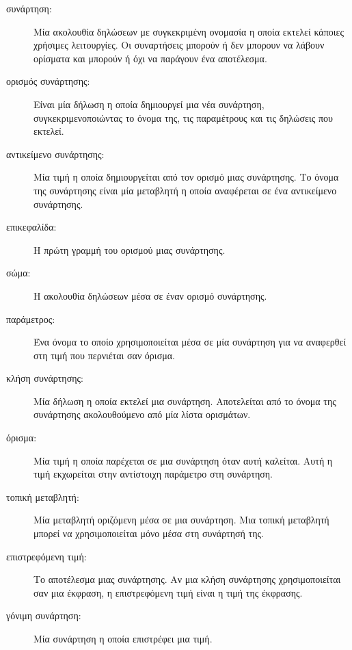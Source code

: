 \documentclass[10pt]{book}
\begin{document}
\begin{description}

\item[συνάρτηση:] Μία ακολουθία δηλώσεων με συγκεκριμένη ονομασία η οποία εκτελεί κάποιες
χρήσιμες λειτουργίες. Οι συναρτήσεις μπορούν ή δεν μπορουν να λάβουν ορίσματα
και μπορούν ή όχι να παράγουν ένα αποτέλεσμα.

\item[ορισμός συνάρτησης:] Είναι μία δήλωση η οποία δημιουργεί μια νέα συνάρτηση,
συγκεκριμενοποιώντας το όνομα της, τις παραμέτρους και τις δηλώσεις που εκτελεί.

\item[αντικείμενο συνάρτησης: ] Μία τιμή η οποία δημιουργείται από τον ορισμό μιας συνάρτησης.
Το όνομα της συνάρτησης είναι μία μεταβλητή η οποία αναφέρεται σε ένα αντικείμενο
συνάρτησης.

\item[επικεφαλίδα:] Η πρώτη γραμμή του ορισμού μιας συνάρτησης.

\item[σώμα:] Η ακολουθία δηλώσεων μέσα σε έναν ορισμό συνάρτησης.

\item[παράμετρος:] Ένα όνομα το οποίο χρησιμοποιείται μέσα σε μία συνάρτηση για να
αναφερθεί στη τιμή που περνιέται σαν όρισμα.

\item[κλήση συνάρτησης:] Μία δήλωση η οποία εκτελεί μια συνάρτηση. Αποτελείται από το
όνομα της συνάρτησης ακολουθούμενο από μία λίστα ορισμάτων.

\item[όρισμα:] Μία τιμή η οποία παρέχεται σε μια συνάρτηση όταν αυτή καλείται.
Αυτή η τιμή εκχωρείται στην αντίστοιχη παράμετρο στη συνάρτηση.

\item[τοπική μεταβλητή:] Μία μεταβλητή οριζόμενη μέσα σε μια συνάρτηση. Μια τοπική
μεταβλητή μπορεί να χρησιμοποιείται μόνο μέσα στη συνάρτησή της.

\item[επιστρεφόμενη τιμή:] Το αποτέλεσμα μιας συνάρτησης. Αν μια κλήση συνάρτησης
χρησιμοποιείται σαν μια έκφραση, η επιστρεφόμενη τιμή είναι η τιμή της έκφρασης.

\item[γόνιμη συνάρτηση:] Μία συνάρτηση η οποία επιστρέφει μια τιμή.


\end{description}
\end{document}

